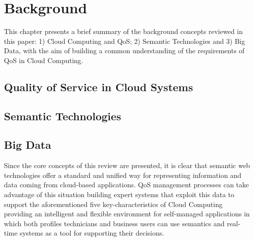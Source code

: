 \chapter{Background}
This chapter presents a brief summary of the background concepts reviewed in this paper: 
1) Cloud Computing and QoS; 2) Semantic Technologies and 3) Big Data, with the 
aim of building a common understanding of the requirements of QoS in Cloud Computing.


\section{Quality of Service in Cloud Systems}\label{qos-cloud-index}

\section{Semantic Technologies}

\section{Big Data}


Since the core concepts of this review are presented, it is clear that semantic 
web technologies offer a standard and unified way for representing information 
and data coming from cloud-based applications. QoS management processes can 
take advantage of this situation building expert systems that exploit this data to support the aforementioned five 
key-characteristics of Cloud Computing providing an intelligent and flexible environment for 
self-managed applications in which both profiles technicians and business users can use 
semantics and real-time systems as a tool for supporting their decisions.
